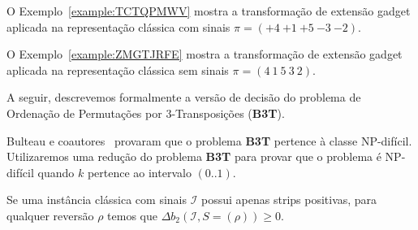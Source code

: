 O Exemplo~\ref{example:TCTQPMWV} mostra a transformação de extensão gadget aplicada na representação clássica com sinais $\pi=({+4}~{+1}~{+5}~{-3}~{-2})$.



O Exemplo~\ref{example:ZMGTJRFE} mostra a transformação de extensão gadget aplicada na representação clássica sem sinais $\pi=(4~1~5~3~2)$.

\pagebreak


A seguir, descrevemos formalmente a versão de decisão do problema de Ordenação de Permutações por 3-Transposições (\textbf{B3T}).

\begin{decision}
\end{decision}

Bulteau e coautores~\cite{2012-bulteau-etal} provaram que o problema \textbf{B3T} pertence à classe NP-difícil. Utilizaremos uma redução do problema \textbf{B3T} para provar que o problema \SbPRT{} é NP-difícil quando $k$ pertence ao intervalo $(0..1)$.

\begin{lemma}\label{lemma:CWNRJAPM}
Se uma instância clássica com sinais $\mathcal{I}$ possui apenas strips positivas, para qualquer reversão $\rho$ temos que $\Delta b_2(\mathcal{I}, S=(\rho)) \ge 0$.
\end{lemma}

